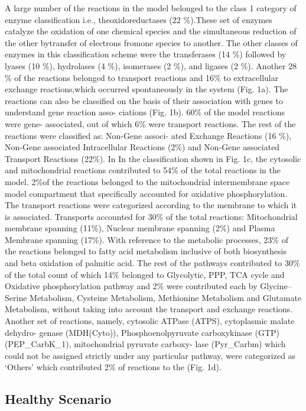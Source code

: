 A large number of the reactions in the model belonged to the class 1 category of enzyme classification i.e., theoxidoreductases (22 \%).These set of enzymes catalyze the oxidation of one chemical species and the simultaneous reduction of the other bytransfer of electrons fromone species to another. The other classes of enzymes in this classification scheme were the transferases (14 \%) followed by lyases (10 \%), hydrolases (4 \%), isomerases (2 \%), and ligases (2 \%). Another 28 \% of the reactions belonged to transport reactions and 16\% to extracellular exchange reactions,which occurred spontaneously in the system (Fig. 1a). The reactions can also be classified on the basis of their
association with genes to understand gene reaction asso- ciations (Fig. 1b). 60\% of the model reactions were gene- associated, out of which 6\% were transport reactions. 
The rest of the reactions were classified as: Non-Gene associ- ated Exchange Reactions (16 \%), Non-Gene associated Intracellular Reactions (2\%) and Non-Gene associated Transport Reactions (22\%). In In the classification shown in Fig. 1c, the cytosolic and
mitochondrial reactions contributed to 54\% of the total reactions in the model. 2\%of the reactions belonged to the mitochondrial intermembrane space model compartment that specifically accounted for oxidative phosphorylation. The transport reactions were categorized according to the membrane to which it is associated. Transports accounted for 30\% of the total reactions: Mitochondrial membrane spanning (11\%), Nuclear membrane spanning (2\%) and Plasma Membrane spanning (17\%). With reference to the metabolic processes, 23\% of the
reactions belonged to fatty acid metabolism inclusive of both biosynthesis and beta oxidation of palmitic acid. The rest of the pathways contributed to 30\% of the total count of which 14\% belonged to Glycolytic, PPP, TCA cycle and Oxidative phosphorylation pathway and 2\% were contributed each by Glycine–Serine Metabolism, Cysteine Metabolism, Methionine Metabolism and Glutamate Metabolism, without taking into account the transport and exchange reactions. Another set of reactions, namely, cytosolic ATPase (ATPS), cytoplasmic malate dehydro- genase (MDH(Cyto)), Phosphoenolpyruvate carboxykinase (GTP) (PEP\_CarbK\_1), mitochondrial pyruvate carboxy- lase (Pyr\_Carbm) which could not be assigned strictly under any particular pathway, were categorized as ‘Others’ which contributed 2\% of reactions to the (Fig. 1d).
\subsection*{Healthy Scenario}
